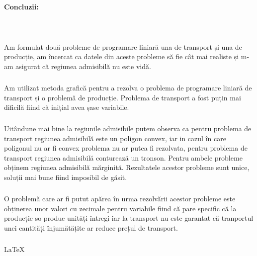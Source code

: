 \clearpage
\paragraph{\large Concluzii:}\mbox{}\\

\subparagraph{}{
Am formulat două probleme de programare liniară una de transport și una de producție, am încercat ca datele din aceste probleme să fie cât mai realiste și m-am asigurat că regiunea admisibilă nu este vidă.
}

\subparagraph{}{
Am utilizat metoda grafică pentru a rezolva o problema de programare liniară de transport și o problemă de producție. Problema de transport a fost puțin mai dificilă fiind că inițial avea șase variabile.
}


\subparagraph{}{
Uitândune mai bine la regiunile admisibile putem observa ca pentru problema de transport regiunea admisibilă este un poligon convex, iar in cazul în care poligonul nu ar fi convex problema nu ar putea fi rezolvata, pentru problema de transport regiunea admisibilă conturează un tronson.
Pentru ambele probleme obținem regiunea admisibilă mărginită.
Rezultatele acestor probleme sunt unice, soluții mai bune fiind imposibil de găsit.
}

\subparagraph{}{
O problemă care ar fi putut apărea în urma rezolvării acestor probleme este obținerea unor valori cu zecimale pentru variabile fiind că pare specific că la producție so produc unități întregi iar la transport nu este garantat că tranportul unei cantități înjumătățite ar reduce prețul de transport. 
}

\subparagraph{}{
	\LaTeX
}

